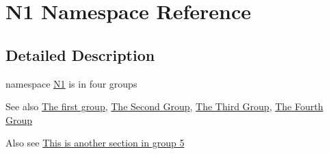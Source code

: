 \hypertarget{namespace_n1}{}\section{N1 Namespace Reference}
\label{namespace_n1}


\subsection{Detailed Description}
namespace \hyperlink{namespace_n1}{N1} is in four groups \begin{DoxySeeAlso}{See also}
\hyperlink{group__group1}{The first group}, \hyperlink{group__group2}{The Second Group}, \hyperlink{group__group3}{The Third Group}, \hyperlink{group__group4}{The Fourth Group}
\end{DoxySeeAlso}
Also see \hyperlink{group__group5}{This is another section in group 5} 